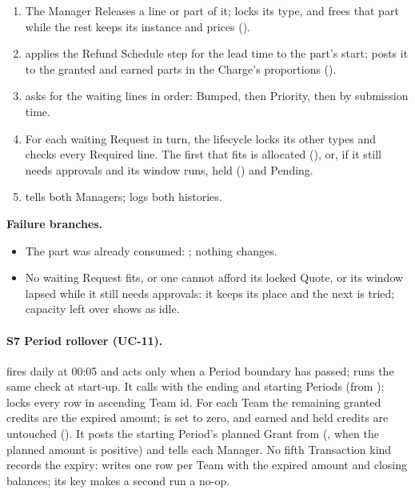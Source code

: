 \begin{enumerate}
\item The Manager Releases a line or part of it;  locks its type, and  frees that part while the rest keeps its instance and prices ().
\item {} applies the Refund Schedule step for the lead time to the part's start;  posts it to the granted and earned parts in the Charge's proportions ().
\item {} asks  for the waiting lines in order: Bumped, then Priority, then by submission time.
\item For each waiting Request in turn, the lifecycle locks its other types and checks every Required line. The first that fits is allocated (), or, if it still needs approvals and its window runs, held () and Pending.
\item {} tells both Managers;  logs both histories.
\end{enumerate}
\par\textbf{Failure branches.}
\begin{itemize}
\item The part was already consumed: ; nothing changes.
\item No waiting Request fits, or one cannot afford its locked Quote, or its window lapsed while it still needs approvals: it keeps its place and the next is tried; capacity left over shows as idle.
\end{itemize}

\paragraph{S7 Period rollover (UC-11).}  fires daily at 00:05 and acts only when a Period boundary has passed;  runs the same check at start-up. It calls  with the ending and starting Periods (from );  locks every  row in ascending Team id. For each Team the remaining granted credits are the expired amount;  is set to zero, and earned and held credits are untouched (). It posts the starting Period's planned Grant from  (, when the planned amount is positive) and  tells each Manager. No fifth Transaction kind records the expiry:  writes one  row per Team with the expired amount and closing balances; its key makes a second run a no-op.
\endgroup
